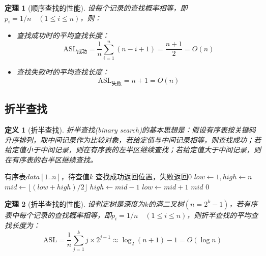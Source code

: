 \documentclass[12pt,a4paper]{amsart}
\newtheorem{definition}{定义}[section]
\newtheorem{theorem}{定理}[section]
\begin{document}
\begin{theorem}[顺序查找的性能]
设每个记录的查找概率相等，即$p_i = 1/n \quad (1 \leq i \leq n)$，则：
\begin{itemize}
\item 查找成功时的平均查找长度：
\begin{equation}
\text{ASL}_{\text{成功}} = \frac{1}{n}\sum_{i=1}^{n}(n-i+1) = \frac{n+1}{2} = O(n)
\end{equation}
\item 查找失败时的平均查找长度：
\begin{equation}
\text{ASL}_{\text{失败}} = n+1 = O(n)
\end{equation}
\end{itemize}
\end{theorem}

\subsection{折半查找}

\begin{definition}[折半查找]
折半查找(binary search)的基本思想是：假设有序表按关键码升序排列，取中间记录作为比较对象，若给定值与中间记录相等，则查找成功；若给定值小于中间记录，则在有序表的左半区继续查找；若给定值大于中间记录，则在有序表的右半区继续查找。
\end{definition}

\begin{algorithm}
\caption{折半查找（非递归）}
\begin{algorithmic}[1]
\REQUIRE 有序表$data[1..n]$，待查值$k$
\ENSURE 查找成功返回位置，失败返回0
\STATE $low \leftarrow 1, high \leftarrow n$
    \STATE $mid \leftarrow \lfloor(low + high)/2\rfloor$
        \STATE $high \leftarrow mid - 1$
        \STATE $low \leftarrow mid + 1$
    \ELSE
        \RETURN $mid$
    \ENDIF
\ENDWHILE
\RETURN $0$
\end{algorithmic}
\end{algorithm}

\begin{theorem}[折半查找的性能]
设判定树是深度为$k$的满二叉树$(n = 2^k - 1)$，若有序表中每个记录的查找概率相等，即$p_i = 1/n \quad (1 \leq i \leq n)$，则折半查找的平均查找长度为：
\begin{equation}
\text{ASL} = \frac{1}{n}\sum_{j=1}^{k} j \times 2^{j-1} \approx \log_2(n+1) - 1 = O(\log n)
\end{equation}
\end{theorem}
\end{document}
